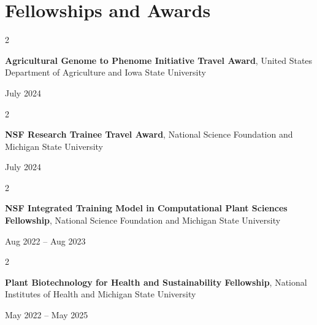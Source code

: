 \documentclass[10pt, letterpaper]{article}
\newenvironment{twocolentry}[2][]{
    \onecolentry
    \def\secondColumn{#2}
    \setcolumnwidth{\fill, 4.5 cm}
    \begin{paracol}{2}
}{
    \switchcolumn \raggedleft \secondColumn
    \end{paracol}
    \endonecolentry
} %
\begin{document}
    \section{Fellowships and Awards}




        \begin{samepage} 
            \begin{twocolentry}{
                July 2024
                }
                \textbf{Agricultural Genome to Phenome Initiative Travel Award}, United States Department of Agriculture and Iowa State University
            \end{twocolentry}
        \end{samepage}  


        \vspace{0.2 cm}


        \begin{samepage} 
            \begin{twocolentry}{
                July 2024
                }
                \textbf{NSF Research Trainee Travel Award}, National Science Foundation and Michigan State University
            \end{twocolentry}
        \end{samepage}  


        \vspace{0.2 cm}


        \begin{samepage} 
            \begin{twocolentry}{
                Aug 2022 – Aug 2023
                }
                \textbf{NSF Integrated Training Model in Computational Plant Sciences Fellowship}, National Science Foundation and Michigan State University
            \end{twocolentry}
        \end{samepage}  


        \vspace{0.2 cm}


        \begin{samepage} 
            \begin{twocolentry}{
                May 2022 – May 2025
                }
                \textbf{Plant Biotechnology for Health and Sustainability Fellowship}, National Institutes of Health and Michigan State University
            \end{twocolentry}
        \end{samepage} 
\end{document}
